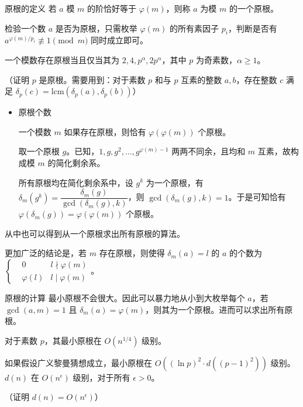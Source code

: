 \documentclass [hyperref={bookmarksdepth=4}, aspectratio=169] {beamer}
\theoremstyle {fy}
\begin{document}
\begin{frame}{原根的定义}
若 $a$ 模 $m$ 的阶恰好等于 $\varphi(m)$，则称 $a$ 为模 $m$ 的一个原根。

检验一个数 $a$ 是否为原根，只需枚举 $\varphi(m)$ 的所有素因子 $p_i$，判断是否有 $a^{\varphi(m)/p_i}\not\equiv1\pmod m$ 同时成立即可。

一个模数存在原根当且仅当其为 $2,4,p^\alpha,2p^{\alpha}$，其中 $p$ 为奇素数，$\alpha\ge 1$。

（证明 $p$ 是原根。需要用到：对于素数 $p$ 和与 $p$ 互素的整数 $a,b$，存在整数 $c$ 满足 $\delta_p(c)=\mathrm{lcm}(\delta_p(a),\delta_p(b))$）

\begin{itemize}
    \item 原根个数

  一个模数 $m$ 如果存在原根，则恰有 $\varphi(\varphi(m))$ 个原根。

  取一个原根 $g$。已知，$1,g,g^2,\dots,g^{\varphi(m)-1}$ 两两不同余，且均和 $m$ 互素，故构成模 $m$ 的简化剩余系。

  所有原根均在简化剩余系中，设 $g^k$ 为一个原根，有 $\delta_m(g^k)=\dfrac{\delta_m(g)}{\gcd(\delta_m(g),k)}$，则 $\gcd(\delta_m(g),k)=1$。于是可知恰有 $\varphi(\delta_m(g))=\varphi(\varphi(m))$ 个原根。
\end{itemize}

从中也可以得到从一个原根求出所有原根的算法。

更加广泛的结论是，若 $m$ 存在原根，则使得 $\delta_m(a)=l$ 的 $a$ 的个数为 $\left\{\begin{aligned}&0 &l\nmid\varphi(m)\\&\varphi(l) &l\mid\varphi(m) \end{aligned} \right.$。
\end{frame}

\begin{frame}{原根的计算}
最小原根不会很大。因此可以暴力地从小到大枚举每个 $a$，若 $\gcd(a,m)=1$ 且 $\delta_m(a)=\varphi(m)$，则其为一个原根。进而可以求出所有原根。

对于素数 $p$，其最小原根在 $O(n^{1/4})$ 级别。

如果假设广义黎曼猜想成立，最小原根在 $O((\ln p)^2\cdot d((p-1)^2))$ 级别。$d(n)$ 在 $O(n^{\epsilon})$ 级别，对于所有 $\epsilon>0$。

（证明 $d(n)=O(n^{\epsilon})$）
\end{frame}
\end{document}
